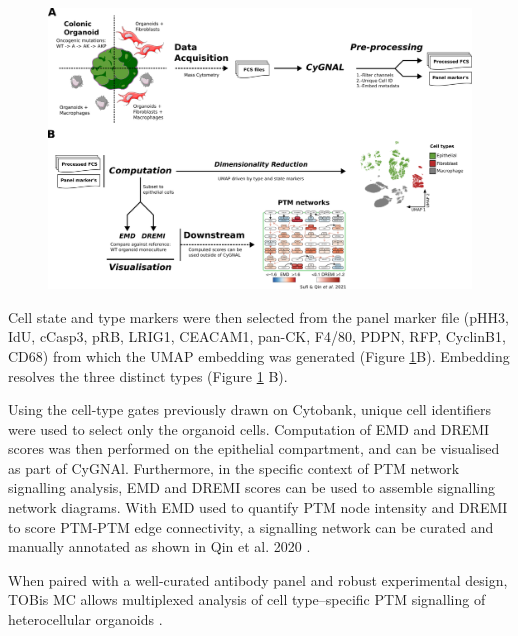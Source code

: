 \begin{figure}
    \centering
    \includegraphics{03cytof/figs/3CYGNAL_usage.png}
    \caption{}
    \label{fig:3cyguse}
\end{figure}

Cell state and type markers were then selected from the panel marker file (pHH3, IdU, cCasp3, pRB, LRIG1, CEACAM1, pan-CK, F4/80, PDPN, RFP, CyclinB1, CD68) from which the UMAP embedding was generated (Figure \ref{fig:3cyguse}B). Embedding resolves the three distinct types (Figure \ref{fig:3cyguse} B).

Using the cell-type gates previously drawn on Cytobank, unique cell identifiers were used to select only the organoid cells. Computation of EMD and DREMI scores was then performed on the epithelial compartment, and can be visualised as part of CyGNAl. Furthermore, in the specific context of PTM network signalling analysis, EMD and DREMI scores can be used to assemble signalling network diagrams. With EMD used to quantify PTM node intensity and DREMI to score PTM-PTM edge connectivity, a signalling network can be curated and manually annotated as shown in Qin et al. 2020 \cite{qin_cell-type-specific_2020}. 

When paired with a well-curated antibody panel and robust experimental design, TOBis MC allows multiplexed analysis of cell type–specific PTM signalling of heterocellular organoids \cite{sufi_multiplexed_2021}. 

